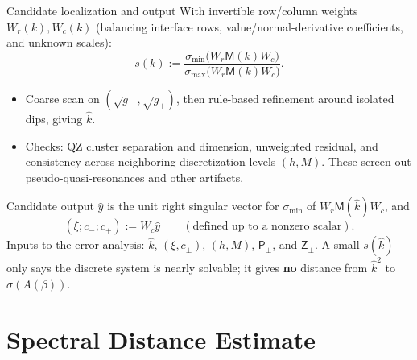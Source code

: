\documentclass[aspectratio=169]{beamer}
\begin{document}
\begin{frame}{Candidate localization and output}
  \footnotesize
  With invertible row/column weights $W_r(k),W_c(k)$ (balancing interface rows,
  value/normal-derivative coefficients, and unknown scales):
  \[
    s(k):=\frac{\sigma_{\min}\bigl(W_r\mathsf M(k)W_c\bigr)}{\sigma_{\max}\bigl(W_r\mathsf M(k)W_c\bigr)}.
  \]
  \begin{itemize}
    \item Coarse scan on $(\sqrt{g_-},\sqrt{g_+})$, then rule-based refinement around
      isolated dips, giving $\widehat k$.
    \item Checks: QZ cluster separation and dimension, unweighted residual, and
      consistency across neighboring discretization levels $(h,M)$. These screen out
      pseudo-quasi-resonances and other artifacts.
  \end{itemize}

  \begin{block}{Candidate output}
    $\widehat y$ is the unit right singular vector for $\sigma_{\min}$ of
    $W_r\mathsf M(\widehat k)W_c$, and
    \[
      (\xi;c_-;c_+):=W_c\widehat y\qquad(\text{defined up to a nonzero scalar}).
    \]
    Inputs to the error analysis: $\widehat k$, $(\xi,c_\pm)$, $(h,M)$,
    $\mathsf P_\pm$, and $\mathsf Z_\pm$. A small $s(\widehat k)$ only says the discrete
    system is nearly solvable; it gives \textbf{no} distance from $\widehat k^2$ to
    $\sigma(A(\beta))$.
  \end{block}
\end{frame}

\section{Spectral Distance Estimate}
\end{document}
